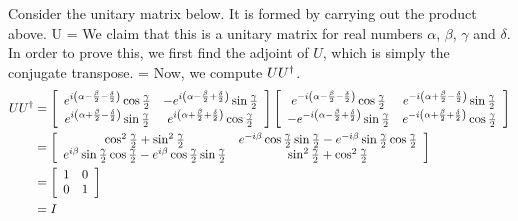 Consider the unitary matrix below. It is formed by carrying out the product above.
\beq
U = 
\eeq
We claim that this is a unitary matrix for real numbers $\alpha$, $\beta$, $\gamma$ and $\delta$. In order to prove this, we first find the adjoint of $U$, which is simply the conjugate transpose.
\beq
{} = 
\eeq
Now, we compute $UU^\dagger$.
\begin{align}
UU^\dagger &= \left[\begin{array}{cc}e^{i\left(\alpha-\frac{\beta}{2}-\frac{\delta}{2}\right)}\cos\frac{\gamma}{2} & -e^{i\left(\alpha-\frac{\beta}{2}+\frac{\delta}{2}\right)}\sin\frac{\gamma}{2}\\
e^{i\left(\alpha+\frac{\beta}{2}-\frac{\delta}{2}\right)}\sin\frac{\gamma}{2} & e^{i\left(\alpha+\frac{\beta}{2}+\frac{\delta}{2}\right)}\cos\frac{\gamma}{2}\end{array}\right]\left[\begin{array}{cc}e^{-i\left(\alpha-\frac{\beta}{2}-\frac{\delta}{2}\right)}\cos\frac{\gamma}{2} & e^{-i\left(\alpha+\frac{\beta}{2}-\frac{\delta}{2}\right)}\sin\frac{\gamma}{2}\\
-e^{-i\left(\alpha-\frac{\beta}{2}+\frac{\delta}{2}\right)}\sin\frac{\gamma}{2} & e^{-i\left(\alpha+\frac{\beta}{2}+\frac{\delta}{2}\right)}\cos\frac{\gamma}{2}\end{array}\right]\\
&= \left[\begin{array}{cc}\cos^2\frac{\gamma}{2}+\sin^2\frac{\gamma}{2} & e^{-i\beta}\cos\frac{\gamma}{2}\sin\frac{\gamma}{2}-e^{-i\beta}\sin\frac{\gamma}{2}\cos\frac{\gamma}{2}\\
e^{i\beta}\sin\frac{\gamma}{2}\cos\frac{\gamma}{2}-e^{i\beta}\cos\frac{\gamma}{2}\sin\frac{\gamma}{2} & \sin^2\frac{\gamma}{2}+\cos^2\frac{\gamma}{2}\end{array}\right]\\
&= \left[\begin{array}{cc}1 & 0\\
0 & 1\end{array}\right]\\
&= I
\end{align}
